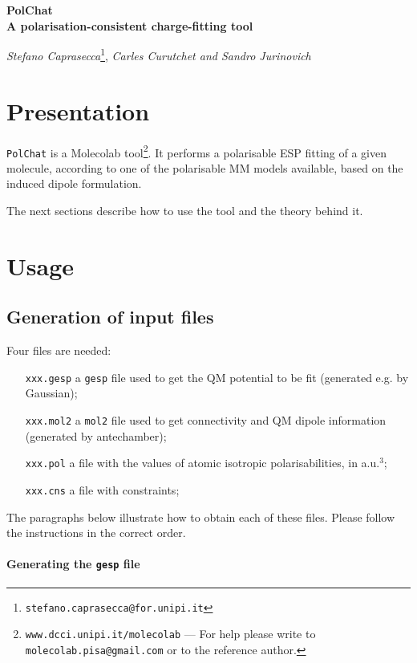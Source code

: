 \documentclass[a4paper]{report}
\begin{document}
\Large
\begin{center}
\textbf{PolChat \\ A polarisation-consistent charge-fitting tool}
\end{center}
\normalsize
\begin{center}
\emph{Stefano Caprasecca}\footnote{\texttt{stefano.caprasecca@for.unipi.it}}, \emph{Carles Curutchet and Sandro Jurinovich}
\end{center}

\section*{Presentation}

\texttt{PolChat} is a Molecolab tool\footnote{\texttt{www.dcci.unipi.it/molecolab} ---
For help please write to \texttt{molecolab.pisa@gmail.com} or to the reference author.}. It performs a
polarisable ESP fitting of a given molecule, according to one of the polarisable MM models available, based on the induced dipole formulation.

The next sections describe how to use the tool and the theory behind it.

\section*{Usage}

\subsection*{Generation of input files}

Four files are needed:
\begin{itemize}
\item[\texttt{xxx.gesp}] a \texttt{gesp} file used to get the QM potential to be fit
(generated e.g. by Gaussian);
\item[\texttt{xxx.mol2}] a \texttt{mol2} file used to get connectivity and QM dipole
information (generated by antechamber);
\item[\texttt{xxx.pol}] a file with the values of atomic isotropic polarisabilities,
in a.u.$^3$;
\item[\texttt{xxx.cns}] a file with constraints;
\end{itemize}

The paragraphs below illustrate how to obtain each of these files. Please follow the instructions in
the correct order.

\paragraph*{Generating the \texttt{gesp} file}
\end{document}
